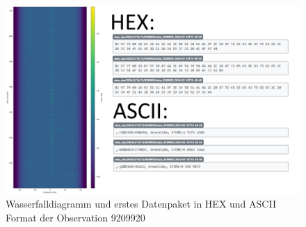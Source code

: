 \begin{figure} [H]
	\centering
	\includegraphics[width=\linewidth]{../ref/helix_successfull_observation.png}
	\caption{Wasserfalldiagramm und erstes Datenpaket in HEX und ASCII Format der Observation 9209920 \cite{noauthor_satnogs_observation_helix_nodate}}
	\label{fig:helix_successfull_observation}
\end{figure}